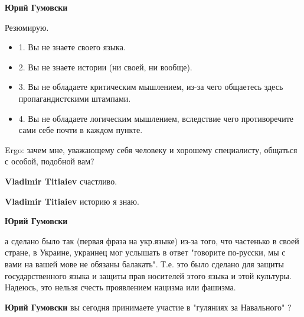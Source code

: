 \begin{itemize}

\textbf{Юрий Гумовски} 

Резюмирую.

\begin{itemize}
  \item 1. Вы не знаете своего языка.
  \item 2. Вы не знаете истории (ни своей, ни вообще).
  \item 3. Вы не обладаете критическим мышлением, из-за чего общаетесь здесь пропагандистскими штампами.
  \item 4. Вы не обладаете логическим мышлением, вследствие чего противоречите сами себе почти в каждом пункте.
\end{itemize}

Ergo: зачем мне, уважающему себя человеку и хорошему специалисту, общаться с
особой, подобной вам?


\textbf{Vladimir Titiaiev} счастливо.


\textbf{Vladimir Titiaiev} историю я знаю.


\textbf{Юрий Гумовски} 

а сделано было так (первая фраза на укр.языке) из-за того, что частенько в
своей стране, в Украине, украинец мог услышать в ответ "говорите по-русски, мы
с вами на вашей мове не обязаны балакать". Т.е. это было сделано для защиты
государственного языка и защиты прав носителей этого языка и этой культуры.
Надеюсь, это нельзя счесть проявлением нацизма или фашизма.



\textbf{Юрий Гумовски} вы сегодня принимаете участие в "гуляниях за Навального" ?



\end{itemize}

